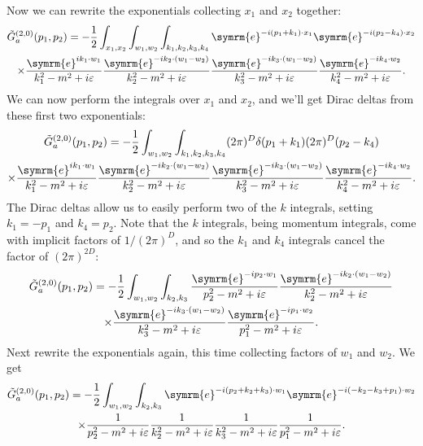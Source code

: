 \documentclass[fleqn]{NotesClass}
\newcommand{\e}{\symrm{e}}
\begin{document}
    Now we can rewrite the exponentials collecting \(x_1\) and \(x_2\) together:
    \begin{multline}
        \tilde{G}^{(2, 0)}_a(p_1, p_2) = -\frac{1}{2} \int_{x_1, x_2} \int_{w_1, w_2} \int_{k_1, k_2, k_3, k_4} \e^{-i(p_1 + k_1) \cdot x_1} \e^{-i(p_2 - k_4) \cdot x_2}\\
        \times \frac{\e^{ik_1 \cdot w_1}}{k_1^2 - m^2 + i\varepsilon} \frac{\e^{-ik_2 \cdot (w_1 - w_2)}}{k_2^2 - m^2 + i\varepsilon} \frac{\e^{-ik_3 \cdot (w_1 - w_2)}}{k_3^2 - m^2 + i\varepsilon} \frac{\e^{-ik_4 \cdot w_2}}{k_4^2 - m^2 + i\varepsilon}.
    \end{multline}
    We can now perform the integrals over \(x_1\) and \(x_2\), and we'll get Dirac deltas from these first two exponentials:
    \begin{multline}
        \tilde{G}^{(2, 0)}_a(p_1, p_2) = -\frac{1}{2} \int_{w_1, w_2} \int_{k_1, k_2, k_3, k_4} (2\pi)^D\delta(p_1 + k_1) (2\pi)^D(p_2 - k_4)\\
        \times \frac{\e^{ik_1 \cdot w_1}}{k_1^2 - m^2 + i\varepsilon} \frac{\e^{-ik_2 \cdot (w_1 - w_2)}}{k_2^2 - m^2 + i\varepsilon} \frac{\e^{-ik_3 \cdot (w_1 - w_2)}}{k_3^2 - m^2 + i\varepsilon} \frac{\e^{-ik_4 \cdot w_2}}{k_4^2 - m^2 + i\varepsilon}.
    \end{multline}
    The Dirac deltas allow us to easily perform two of the \(k\) integrals, setting \(k_1 = -p_1\) and \(k_4 = p_2\).
    Note that the \(k\) integrals, being momentum integrals, come with implicit factors of \(1/(2\pi)^D\), and so the \(k_1\) and \(k_4\) integrals cancel the factor of \((2\pi)^{2D}\):
    \begin{multline}
        \tilde{G}^{(2, 0)}_a(p_1, p_2) = -\frac{1}{2} \int_{w_1, w_2} \int_{k_2, k_3}
        \frac{\e^{-ip_2 \cdot w_1}}{p_2^2 - m^2 + i\varepsilon} \frac{\e^{-ik_2 \cdot (w_1 - w_2)}}{k_2^2 - m^2 + i\varepsilon}\\
        \times \frac{\e^{-ik_3 \cdot (w_1 - w_2)}}{k_3^2 - m^2 + i\varepsilon} \frac{\e^{-ip_1 \cdot w_2}}{p_1^2 - m^2 + i\varepsilon}.
    \end{multline}
    Next rewrite the exponentials again, this time collecting factors of \(w_1\) and \(w_2\).
    We get
    \begin{multline}
        \tilde{G}^{(2, 0)}_a(p_1, p_2) = -\frac{1}{2} \int_{w_1, w_2} \int_{k_2, k_3} \e^{-i(p_2 + k_2 + k_3) \cdot w_1} \e^{-i(-k_2 - k_3 + p_1) \cdot w_2}\\
        \times \frac{1}{p_2^2 - m^2 + i\varepsilon} \frac{1}{k_2^2 - m^2 + i\varepsilon} \frac{1}{k_3^2 - m^2 + i\varepsilon} \frac{1}{p_1^2 - m^2 + i\varepsilon}.
    \end{multline}
\end{document}
